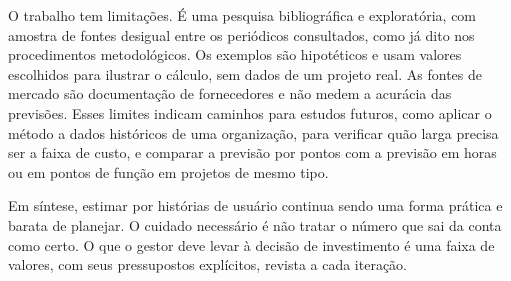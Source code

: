 O trabalho tem limitações. É uma pesquisa bibliográfica e exploratória, com
amostra de fontes desigual entre os periódicos consultados, como já dito nos
procedimentos metodológicos. Os exemplos são hipotéticos e usam valores
escolhidos para ilustrar o cálculo, sem dados de um projeto real. As fontes de
mercado são documentação de fornecedores e não medem a acurácia das previsões.
Esses limites indicam caminhos para estudos futuros, como aplicar o método a
dados históricos de uma organização, para verificar quão larga precisa ser a
faixa de custo, e comparar a previsão por pontos com a previsão em horas ou em
pontos de função em projetos de mesmo tipo.

Em síntese, estimar por histórias de usuário continua sendo uma forma prática e
barata de planejar. O cuidado necessário é não tratar o número que sai da
conta como certo. O que o gestor deve levar à decisão de investimento é uma
faixa de valores, com seus pressupostos explícitos, revista a cada iteração.
